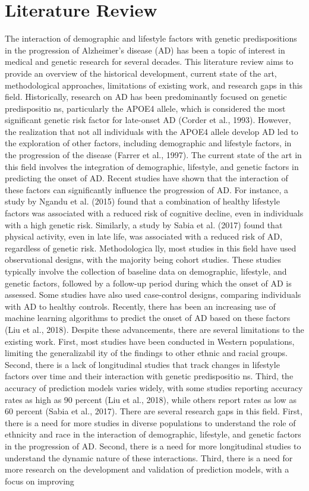 \documentclass[conference]{IEEEtran}
\begin{document}
\section{Literature Review}
The interaction of demographic and lifestyle factors with genetic predispositions in the progression of Alzheimer's disease (AD) has been a topic of interest in medical and genetic research for several decades. This literature review aims to provide an overview of the historical development, current state of the art, methodological approaches, limitations of existing work, and research gaps in this field. Historically, research on AD has been predominantly focused on genetic predispositio ns, particularly the APOE4 allele, which is considered the most significant genetic risk factor for late-onset AD (Corder et al., 1993). However, the realization that not all individuals with the APOE4 allele develop AD led to the exploration of other factors, including demographic and lifestyle factors, in the progression of the disease (Farrer et al., 1997). The current state of the art in this field involves the integration of demographic, lifestyle, and genetic factors in predicting the onset of AD. Recent studies have shown that the interaction of these factors can significantly influence the progression of AD. For instance, a study by Ngandu et al. (2015) found that a combination of healthy lifestyle factors was associated with a reduced risk of cognitive decline, even in individuals with a high genetic risk. Similarly, a study by Sabia et al. (2017) found that physical activity, even in late life, was associated with a reduced risk of AD, regardless of genetic risk. Methodologica lly, most studies in this field have used observational designs, with the majority being cohort studies. These studies typically involve the collection of baseline data on demographic, lifestyle, and genetic factors, followed by a follow-up period during which the onset of AD is assessed. Some studies have also used case-control designs, comparing individuals with AD to healthy controls. Recently, there has been an increasing use of machine learning algorithms to predict the onset of AD based on these factors (Liu et al., 2018). Despite these advancements, there are several limitations to the existing work. First, most studies have been conducted in Western populations, limiting the generalizabil ity of the findings to other ethnic and racial groups. Second, there is a lack of longitudinal studies that track changes in lifestyle factors over time and their interaction with genetic predispositio ns. Third, the accuracy of prediction models varies widely, with some studies reporting accuracy rates as high as 90 percent (Liu et al., 2018), while others report rates as low as 60 percent (Sabia et al., 2017). There are several research gaps in this field. First, there is a need for more studies in diverse populations to understand the role of ethnicity and race in the interaction of demographic, lifestyle, and genetic factors in the progression of AD. Second, there is a need for more longitudinal studies to understand the dynamic nature of these interactions. Third, there is a need for more research on the development and validation of prediction models, with a focus on improving 
\end{document}
